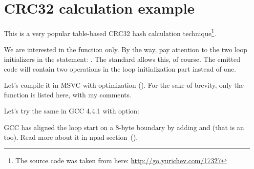 \chapter{CRC32 calculation example}
\label{sec:CRC32}

\newcommand{\URLCRCSRC}{\url{http://go.yurichev.com/17327}}

This is a very popular table-based CRC32 hash calculation 
technique\footnote{The source code was taken from here: \URLCRCSRC}.




We are interested in the  function only.
By the way, pay attention to the two loop initializers in the  statement: .
The \CCpp standard allows this, of course.
The emitted code will contain two operations in the loop initialization part
instead of one.

Let's compile it in MSVC with optimization (\Ox).
For the sake of brevity, only the  function is listed here, with my comments.



Let's try the same in GCC 4.4.1 with \Othree option:




GCC has aligned the loop start on a 8-byte boundary by adding \NOP and 
(that is an  too).
Read more about it in npad section~().

